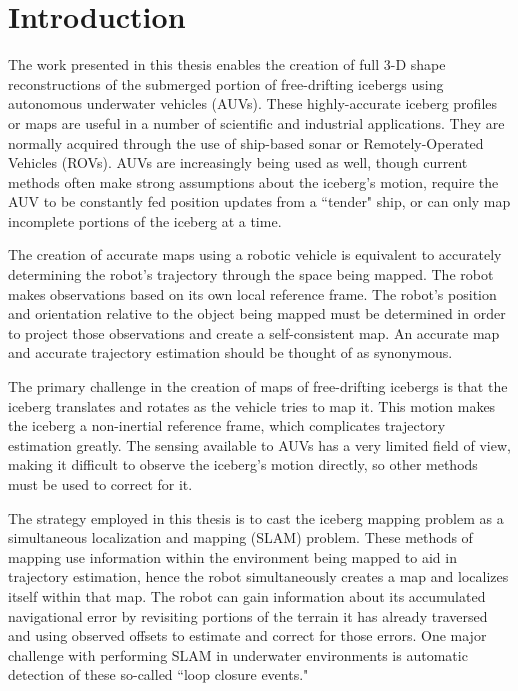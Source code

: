 
\chapter{Introduction}
\label{ch.Introduction}
The work presented in this thesis enables the creation of full 3-D shape reconstructions of the submerged portion of free-drifting icebergs using autonomous underwater vehicles (AUVs). These highly-accurate iceberg profiles or maps are useful in a number of scientific and industrial applications. They are normally acquired through the use of ship-based sonar or Remotely-Operated Vehicles (ROVs). AUVs are increasingly being used as well, though current methods often make strong assumptions about the iceberg's motion, require the AUV to be constantly fed position updates from a ``tender" ship, or can only map incomplete portions of the iceberg at a time.

The creation of accurate maps using a robotic vehicle is equivalent to accurately determining the robot's trajectory through the space being mapped. The robot makes observations based on its own local reference frame. The robot's position and orientation relative to the object being mapped must be determined in order to project those observations and create a self-consistent map. An accurate map and accurate trajectory estimation should be thought of as synonymous.

The primary challenge in the creation of maps of free-drifting icebergs is that the iceberg translates and rotates as the vehicle tries to map it. This motion makes the iceberg a non-inertial reference frame, which complicates trajectory estimation greatly. The sensing available to AUVs has a very limited field of view, making it difficult to observe the iceberg's motion directly, so other methods must be used to correct for it. 

The strategy employed in this thesis is to cast the iceberg mapping problem as a simultaneous localization and mapping (SLAM) problem. These methods of mapping use information within the environment being mapped to aid in trajectory estimation, hence the robot simultaneously creates a map and localizes itself within that map. The robot can gain information about its accumulated navigational error by revisiting portions of the terrain it has already traversed and using observed offsets to estimate and correct for those errors. One major challenge with performing SLAM in underwater environments is automatic detection of these so-called ``loop closure events."


